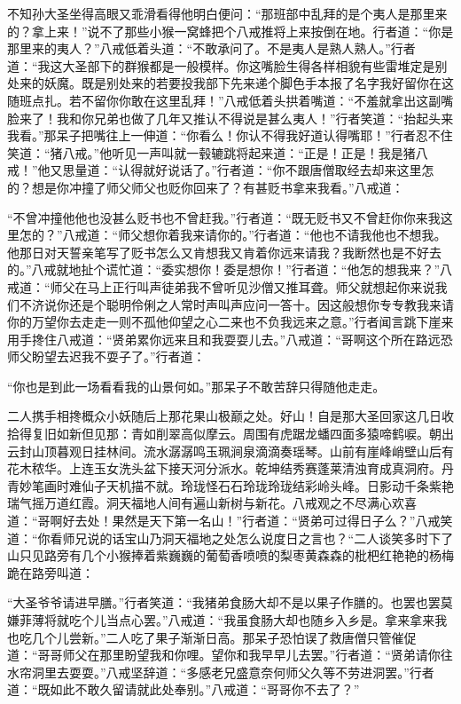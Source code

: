 \documentclass[12pt,UTF8]{ctexbook}
\begin{document}
不知孙大圣坐得高眼又乖滑看得他明白便问：“那班部中乱拜的是个夷人是那里来的？拿上来！”说不了那些小猴一窝蜂把个八戒推将上来按倒在地。行者道：“你是那里来的夷人？”八戒低着头道：“不敢承问了。不是夷人是熟人熟人。”行者道：“我这大圣部下的群猴都是一般模样。你这嘴脸生得各样相貌有些雷堆定是别处来的妖魔。既是别处来的若要投我部下先来递个脚色手本报了名字我好留你在这随班点扎。若不留你你敢在这里乱拜！”八戒低着头拱着嘴道：“不羞就拿出这副嘴脸来了！我和你兄弟也做了几年又推认不得说是甚么夷人！”行者笑道：“抬起头来我看。”那呆子把嘴往上一伸道：“你看么！你认不得我好道认得嘴耶！”行者忍不住笑道：“猪八戒。”他听见一声叫就一毂辘跳将起来道：“正是！正是！我是猪八戒！”他又思量道：“认得就好说话了。”行者道：“你不跟唐僧取经去却来这里怎的？想是你冲撞了师父师父也贬你回来了？有甚贬书拿来我看。”八戒道：

“不曾冲撞他他也没甚么贬书也不曾赶我。”行者道：“既无贬书又不曾赶你你来我这里怎的？”八戒道：“师父想你着我来请你的。”行者道：“他也不请我他也不想我。他那日对天誓亲笔写了贬书怎么又肯想我又肯着你远来请我？我断然也是不好去的。”八戒就地扯个谎忙道：“委实想你！委是想你！”行者道：“他怎的想我来？”八戒道：“师父在马上正行叫声徒弟我不曾听见沙僧又推耳聋。师父就想起你来说我们不济说你还是个聪明伶俐之人常时声叫声应问一答十。因这般想你专专教我来请你的万望你去走走一则不孤他仰望之心二来也不负我远来之意。”行者闻言跳下崖来用手搀住八戒道：“贤弟累你远来且和我耍耍儿去。”八戒道：“哥啊这个所在路远恐师父盼望去迟我不耍子了。”行者道：

“你也是到此一场看看我的山景何如。”那呆子不敢苦辞只得随他走走。

二人携手相搀概众小妖随后上那花果山极巅之处。好山！自是那大圣回家这几日收拾得复旧如新但见那：青如削翠高似摩云。周围有虎踞龙蟠四面多猿啼鹤唳。朝出云封山顶暮观日挂林间。流水潺潺鸣玉珮涧泉滴滴奏瑶琴。山前有崖峰峭壁山后有花木秾华。上连玉女洗头盆下接天河分派水。乾坤结秀赛蓬莱清浊育成真洞府。丹青妙笔画时难仙子天机描不就。玲珑怪石石玲珑玲珑结彩岭头峰。日影动千条紫艳瑞气摇万道红霞。洞天福地人间有遍山新树与新花。八戒观之不尽满心欢喜道：“哥啊好去处！果然是天下第一名山！”行者道：“贤弟可过得日子么？”八戒笑道：“你看师兄说的话宝山乃洞天福地之处怎么说度日之言也？“二人谈笑多时下了山只见路旁有几个小猴捧着紫巍巍的葡萄香喷喷的梨枣黄森森的枇杷红艳艳的杨梅跪在路旁叫道：

“大圣爷爷请进早膳。”行者笑道：“我猪弟食肠大却不是以果子作膳的。也罢也罢莫嫌菲薄将就吃个儿当点心罢。”八戒道：“我虽食肠大却也随乡入乡是。拿来拿来我也吃几个儿尝新。”二人吃了果子渐渐日高。那呆子恐怕误了救唐僧只管催促道：“哥哥师父在那里盼望我和你哩。望你和我早早儿去罢。”行者道：“贤弟请你往水帘洞里去耍耍。”八戒坚辞道：“多感老兄盛意奈何师父久等不劳进洞罢。”行者道：“既如此不敢久留请就此处奉别。”八戒道：“哥哥你不去了？”
\end{document}
